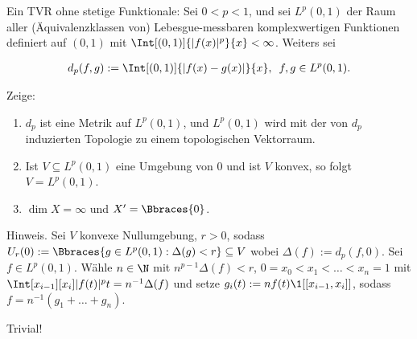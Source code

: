 \begin{exercise}

Ein TVR ohne stetige Funktionale: Sei $0 < p < 1$, und sei $L^p(0, 1)$ der Raum aller (Äquivalenzklassen von) Lebesgue-messbaren komplexwertigen Funktionen definiert auf $(0, 1)$ mit $\Int[(0,1)]{|f(x)|^p}{x} < \infty$.
Weiters sei

\begin{align*}
  d_p(f, g)
  :=
  \Int[(0, 1)]{|f(x) - g(x)|}{x},
  \enspace
  f, g \in L^p(0, 1).
\end{align*}

Zeige:

\begin{enumerate}[label = (\alph*)]
  \item $d_p$ ist eine Metrik auf $L^p(0, 1)$, und $L^p(0, 1)$ wird mit der von $d_p$ induzierten Topologie zu einem topologischen Vektorraum.
  \item Ist $V \subseteq L^p(0, 1)$ eine Umgebung von $0$ und ist $V$ konvex, so folgt $V = L^p(0, 1)$.
  \item $\dim{X} = \infty$ und $X^\prime = \Bbraces{0}$.
\end{enumerate}

Hinweis.
Sei $V$ konvexe Nullumgebung, $r > 0$, sodass $U_r(0) := \Bbraces{g \in L^p(0, 1): \Delta(g) < r} \subseteq V$ wobei $\Delta(f) := d_p(f, 0)$.
Sei $f \in L^p(0, 1)$.
Wähle $n \in \N$ mit $n^{p-1} \Delta(f) < r$, $0 = x_0 < x_1 < \ldots < x_n = 1$ mit $\Int[x_{i-1}][x_i]{|f(t)|^p}{t} = n^{-1} \Delta(f)$ und setze $g_i(t) := n f(t) \1[[x_{i-1}, x_i]]$, sodass $f = n^{-1}(g_1 + \ldots + g_n)$.

\end{exercise}

\begin{solution}

Trivial!

\end{solution}
